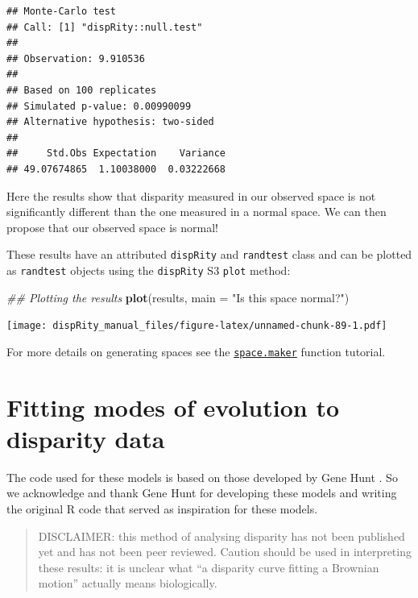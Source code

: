 \documentclass[]{book}
\newenvironment{Shaded}{\begin{snugshade}}{\end{snugshade}}
\newcommand{\CommentTok}[1]{\textcolor[rgb]{0.56,0.35,0.01}{\textit{#1}}}
\newcommand{\DataTypeTok}[1]{\textcolor[rgb]{0.13,0.29,0.53}{#1}}
\newcommand{\KeywordTok}[1]{\textcolor[rgb]{0.13,0.29,0.53}{\textbf{#1}}}
\newcommand{\NormalTok}[1]{#1}
\newcommand{\StringTok}[1]{\textcolor[rgb]{0.31,0.60,0.02}{#1}}
\begin{document}
\begin{verbatim}
## Monte-Carlo test
## Call: [1] "dispRity::null.test"
## 
## Observation: 9.910536 
## 
## Based on 100 replicates
## Simulated p-value: 0.00990099 
## Alternative hypothesis: two-sided 
## 
##     Std.Obs Expectation    Variance 
## 49.07674865  1.10038000  0.03222668
\end{verbatim}

Here the results show that disparity measured in our observed space is not significantly different than the one measured in a normal space.
We can then propose that our observed space is normal!

These results have an attributed \texttt{dispRity} and \texttt{randtest} class and can be plotted as \texttt{randtest} objects using the \texttt{dispRity} S3 \texttt{plot} method:

\begin{Shaded}
\begin{Highlighting}[]
\CommentTok{## Plotting the results}
\KeywordTok{plot}\NormalTok{(results, }\DataTypeTok{main =} \StringTok{"Is this space normal?"}\NormalTok{)}
\end{Highlighting}
\end{Shaded}

\texttt{[image: dispRity\_manual\_files/figure-latex/unnamed-chunk-89-1.pdf]}

For more details on generating spaces see the \protect\hyperlink{Simulating-multidimensional-spaces}{\texttt{space.maker}} function tutorial.

\hypertarget{model-fitting}{%
\section{Fitting modes of evolution to disparity data}\label{model-fitting}}

The code used for these models is based on those developed by Gene Hunt \citep{hunt2006fitting, hunt2012measuring, hunt2015simple}.
So we acknowledge and thank Gene Hunt for developing these models and writing the original R code that served as inspiration for these models.

\begin{quote}
DISCLAIMER: this method of analysing disparity has not been published yet and has not been peer reviewed. Caution should be used in interpreting these results: it is unclear what ``a disparity curve fitting a Brownian motion'' actually means biologically.
\end{quote}
\end{document}
